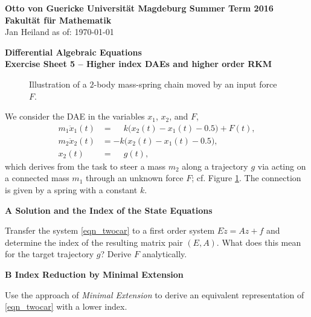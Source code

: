 \documentclass[a4paper,10pt]{article}
\begin{document}
{\bf Otto von Guericke Universit{\"a}t Magdeburg \hfill Summer Term 2016} \\
{\bf Fakult\"at f\"ur Mathematik} \\
Jan Heiland \hfill as of: \today \\


\bigskip
\begin{center}
\textbf{\large Differential Algebraic Equations}\\
\smallskip
\textbf{Exercise Sheet 5 -- Higher index DAEs and higher order RKM}\\
\end{center}

\bigskip


\begin{figure}[h!]
\centering

\caption{Illustration of a $2$-body mass-spring chain moved by an input force $F$.}
\label{fig_2Car_example}
\end{figure}

We consider the DAE in the variables $x_1$, $x_2$, and $F$,
\begin{subequations}
\label{eqn_twocar}
\begin{align}
    m_1\ddot x_1(t) &= \phantom{-} k \big(x_2(t) - x_1(t) - 0.5 \big) + F(t), \label{eqn_twocar_b}\\
  m_2 \ddot x_2(t)&= - k \big(x_2(t) - x_1(t) - 0.5 \big), \label{eqn_twocar_a}\\
        x_2(t) &= \phantom{-} g(t), \label{eqn_twocar_c}
\end{align}
\end{subequations}
which derives from the task to steer a mass $m_2$ along a trajectory $g$ via acting on a connected mass $m_1$ through an unknown force $F$; cf. Figure \ref{fig_2Car_example}. The connection is given by a spring with a constant $k$.

{\bf A Solution and the Index of the State Equations}

Transfer the system \eqref{eqn_twocar} to a first order system $E\dot z = A z + f$ and determine the index of the resulting matrix pair $(E, A)$. What does this mean for the target trajectory $g$? Derive $F$ analytically.
\smallskip

{\bf B Index Reduction by Minimal Extension}

Use the approach of \emph{Minimal Extension} to derive an equivalent representation of \eqref{eqn_twocar} with a lower index.
\smallskip
\end{document}
